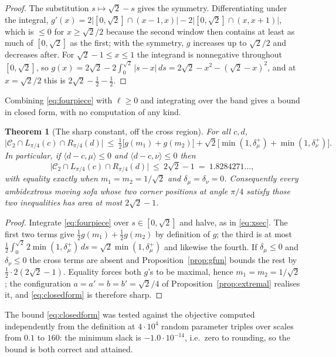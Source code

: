 \documentclass[11pt]{article}
\newtheorem{theorem}{Theorem}
\theoremstyle{definition}
\newcommand{\dmu}{\delta_\mu}
\newcommand{\dnu}{\delta_\nu}
\begin{document}
\begin{proof}
The substitution $s\mapsto\sqrt2-s$ gives the symmetry. Differentiating under the integral,
$g'(x)=2\bigl|[0,\sqrt2]\cap(x-1,x)\bigr|-2\bigl|[0,\sqrt2]\cap(x,x+1)\bigr|$, which is
$\le0$ for $x\ge\sqrt2/2$ because the second window then contains at least as much of
$[0,\sqrt2]$ as the first; with the symmetry, $g$ increases up to $\sqrt2/2$ and decreases
after. For $\sqrt2-1\le x\le1$ the integrand is nonnegative throughout $[0,\sqrt2]$, so
$g(x)=2\sqrt2-2\int_0^{\sqrt2}|s-x|\,ds=2\sqrt2-x^2-(\sqrt2-x)^2$, and at $x=\sqrt2/2$ this
is $2\sqrt2-\tfrac12-\tfrac12$.
\end{proof}

Combining \eqref{eq:fourpiece} with $\ell\ge0$ and integrating over the band gives a bound
in closed form, with no computation of any kind.

\begin{theorem}[The sharp constant, off the cross region]\label{thm:upper}
For all $c,d$,
\begin{equation}\label{eq:closedform}
  \bigl|\mathcal C_2\cap L_{\pi/4}(c)\cap R_{\pi/4}(d)\bigr|\ \le\
  \tfrac12\bigl[g(m_1)+g(m_2)\bigr]+\sqrt2\bigl[\min(1,\dmu^+)+\min(1,\dnu^+)\bigr].
\end{equation}
In particular, if $\langle d-c,\mu\rangle\le0$ and $\langle d-c,\nu\rangle\le0$ then
\[
  \bigl|\mathcal C_2\cap L_{\pi/4}(c)\cap R_{\pi/4}(d)\bigr|\ \le\ 2\sqrt2-1
  \ =\ 1.8284271\ldots,
\]
with equality exactly when $m_1=m_2=1/\sqrt2$ and $\dmu=\dnu=0$. Consequently every
ambidextrous moving sofa whose two corner positions at angle $\pi/4$ satisfy those two
inequalities has area at most $2\sqrt2-1$.
\end{theorem}

\begin{proof}
Integrate \eqref{eq:fourpiece} over $s\in[0,\sqrt2]$ and halve, as in \eqref{eq:xsec}. The
first two terms give $\tfrac12 g(m_1)+\tfrac12 g(m_2)$ by definition of $g$; the third is
at most $\tfrac12\int_0^{\sqrt2}2\min(1,\dmu^+)\,ds=\sqrt2\min(1,\dmu^+)$ and likewise the
fourth. If $\dmu\le0$ and $\dnu\le0$ the cross terms are absent and
Proposition~\ref{prop:gfun} bounds the rest by $\tfrac12\cdot2(2\sqrt2-1)$. Equality forces
both $g$'s to be maximal, hence $m_1=m_2=1/\sqrt2$; the configuration
$a=a'=b=b'=\sqrt2/4$ of Proposition~\ref{prop:extremal} realises it, and
\eqref{eq:closedform} is therefore sharp.
\end{proof}

The bound \eqref{eq:closedform} was tested against the objective computed independently
from the definition at $4\cdot10^4$ random parameter triples over scales from $0.1$ to
$160$: the minimum slack is $-1.0\cdot10^{-14}$, i.e.\ zero to rounding, so the bound is
both correct and attained.
\end{document}
